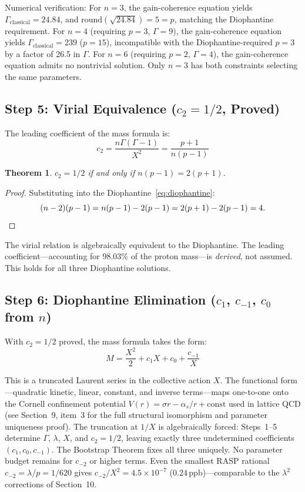 \documentclass[12pt,a4paper]{article}
\newtheorem{theorem}{Theorem}
\theoremstyle{definition}
\newcommand{\ppb}{\,\mathrm{ppb}}
\begin{document}
Numerical verification: For $n = 3$, the gain-coherence equation yields
$\Gamma_\mathrm{classical} = 24.84$, and $\mathrm{round}(\sqrt{24.84}) = 5 = p$,
matching the Diophantine requirement. For $n = 4$ (requiring $p = 3$,
$\Gamma = 9$), the gain-coherence equation yields
$\Gamma_\mathrm{classical} = 239$ ($p = 15$), incompatible with the
Diophantine-required $p = 3$ by a factor of 26.5 in $\Gamma$. For $n = 6$
(requiring $p = 2$, $\Gamma = 4$), the gain-coherence equation admits no
nontrivial solution. Only $n = 3$ has both constraints selecting the same
parameters.

\subsection*{Step 5: Virial Equivalence ($c_2 = 1/2$, Proved)}

The leading coefficient of the mass formula is:
\begin{equation}\label{eq:c2}
  c_2 = \frac{n\Gamma(\Gamma - 1)}{X^2} = \frac{p + 1}{n(p - 1)}
\end{equation}

\begin{theorem}
$c_2 = 1/2$ if and only if $n(p-1) = 2(p+1)$.
\end{theorem}

\begin{proof}
Substituting into the Diophantine~\eqref{eq:diophantine}:
\[
  (n-2)(p-1) = n(p-1) - 2(p-1) = 2(p+1) - 2(p-1) = 4. \qedhere
\]
\end{proof}

The virial relation is algebraically equivalent to the Diophantine.
The leading coefficient---accounting for 98.03\% of the proton mass---is
\emph{derived}, not assumed. This holds for all three Diophantine solutions.

\subsection*{Step 6: Diophantine Elimination ($c_1$, $c_{-1}$, $c_0$ from $n$)}

With $c_2 = 1/2$ proved, the mass formula takes the form:
\begin{equation}\label{eq:mass-general}
  M = \frac{X^2}{2} + c_1 X + c_0 + \frac{c_{-1}}{X}
\end{equation}

This is a truncated Laurent series in the collective action $X$. The
functional form---quadratic kinetic, linear, constant, and inverse
terms---maps one-to-one onto the Cornell confinement potential
$V(r) = \sigma r - \alpha_s/r + \mathrm{const}$ used in lattice QCD
(see Section~9, item~3 for the full structural isomorphism and parameter
uniqueness proof). The truncation at $1/X$ is algebraically forced:
Steps~1--5 determine $\Gamma$, $\lambda$, $X$, and $c_2 = 1/2$,
leaving exactly three undetermined coefficients $(c_1, c_0, c_{-1})$.
The Bootstrap Theorem fixes all three uniquely. No parameter budget
remains for $c_{-2}$ or higher terms. Even the smallest RASP rational
$c_{-2} = \lambda/p = 1/620$ gives $c_{-2}/X^2 = 4.5 \times 10^{-7}$
($0.24\ppb$)---comparable to the $\lambda^2$ corrections of Section~10.
\end{document}
